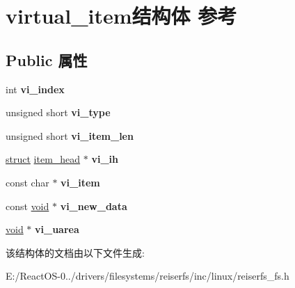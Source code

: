 \hypertarget{structvirtual__item}{}\section{virtual\+\_\+item结构体 参考}
\label{structvirtual__item}
\subsection*{Public 属性}
\begin{DoxyCompactItemize}
\item 
\mbox{\label{structvirtual__item_a4660ac2f654b830163df7a514a2bfaaa}} 
int {\bfseries vi\+\_\+index}
\item 
\mbox{\label{structvirtual__item_af82cba7b591795ba2a9149aaee23d6ca}} 
unsigned short {\bfseries vi\+\_\+type}
\item 
\mbox{\label{structvirtual__item_a4b0fe1c8932d44a464c0713dfb450ef5}} 
unsigned short {\bfseries vi\+\_\+item\+\_\+len}
\item 
\mbox{\label{structvirtual__item_a1cabe29edd0e2a2b7aa8c91cfd0153b1}} 
\hyperlink{interfacestruct}{struct} \hyperlink{structitem__head}{item\+\_\+head} $\ast$ {\bfseries vi\+\_\+ih}
\item 
\mbox{\label{structvirtual__item_a9fb0534d5a045d332f81d75c608345b4}} 
const char $\ast$ {\bfseries vi\+\_\+item}
\item 
\mbox{\label{structvirtual__item_a373cb0800cd3fbf605d41272ba312318}} 
const \hyperlink{interfacevoid}{void} $\ast$ {\bfseries vi\+\_\+new\+\_\+data}
\item 
\mbox{\label{structvirtual__item_a7f43914266473b9e4d622a241ec9b83d}} 
\hyperlink{interfacevoid}{void} $\ast$ {\bfseries vi\+\_\+uarea}
\end{DoxyCompactItemize}


该结构体的文档由以下文件生成\+:\begin{DoxyCompactItemize}
\item 
E\+:/\+React\+O\+S-\/0../drivers/filesystems/reiserfs/inc/linux/reiserfs\+\_\+fs.\+h\end{DoxyCompactItemize}
